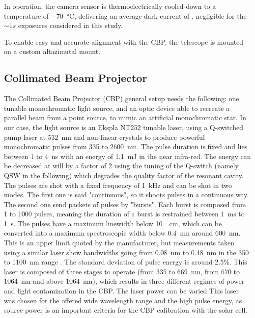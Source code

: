 In operation, the camera sensor is thermoelectrically cooled-down to a
temperature of \SI{-70}{\celsius}, delivering an average dark-current
of , negligible for the
$\sim 1s$ exposures considered in this study.

To enable easy and accurate alignment with the CBP, the telescope is
mounted on a custom altazimutal mount.

\subsection{Collimated Beam Projector}
\label{sec:cbp}


The Collimated Beam Projector (CBP) general setup needs the following: one tunable monochromatic light source, and an optic device able to recreate a parallel beam from a point source, to mimic an artificial monochromatic star. In our case, the light source is an Ekspla NT252 tunable laser, using a Q-switched pump laser at \SI{532}{\nano\meter} and non-linear crystals to produce powerful monochromatic pulses from 335 to \SI{2600}{\nano\meter}. The pulse duration is fixed and lies between 1 to \SI{4}{\nano\second} with an energy of \SI{1.1}{\milli\joule} in the near infra-red. The energy can be decreased at will by a factor of 2 using the tuning of the Q-switch (namely QSW in the following) which degrades the quality factor of the resonant cavity. The pulses are shot with a fixed frequency of \SI{1}{\kilo\hertz} and can be shot in two modes. The first one is said "continuous", so it shoots pulses in a continuous way. The second one send packets of pulses by "bursts". Each burst is composed from 1 to 1000 pulses, meaning the duration of a burst is restrained between \SI{1}{\milli\second} to \SI{1}{\second}. The pulses have a maximum linewidth below \SI{10}{\per\cm}, which can be converted into a maximum spectroscopic width below \SI{0.4}{\nano\meter} around \SI{600}{\nano\meter}. This is an upper limit quoted by the manufacturer, but measurements taken using a similar laser show bandwidths going from \SI{0.08}{\nm} to \SI{0.48}{\nm} in the 350 to \SI{1100}{\nm} range \citep{woodward2018}. The standard deviation of pulse energy is around 2.5\%. This laser is composed of three stages to operate (from 335 to \SI{669}{\nano\meter}, from 670 to \SI{1064}{\nano\meter} and above \SI{1064}{\nano\meter}), which results in three different regimes of power and light contamination in the CBP. The laser power can be varied  This laser was chosen for the offered wide wavelength range and the high pulse energy, as source power is an important criteria for the CBP calibration with the solar cell. 

